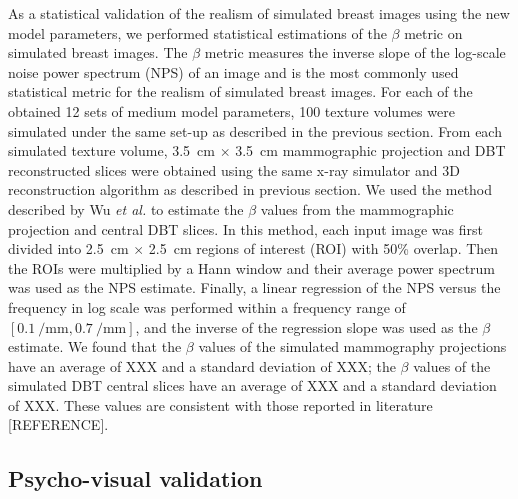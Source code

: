 \documentclass[journal]{IEEEtran}
\begin{document}
As a statistical validation of the realism of simulated breast images
using the new model parameters, we performed statistical estimations
of the $\beta$ metric on simulated breast images. The $\beta$ metric
measures the inverse slope of the log-scale noise power spectrum (NPS)
of an image and is the most commonly used statistical metric for the
realism of simulated breast images. For each of the obtained 12 sets
of medium model parameters, 100 texture volumes were simulated under
the same set-up as described in the previous section. From each
simulated texture volume, \SI{3.5}{\cm} $\times$ \SI{3.5}{\cm}
mammographic projection and DBT reconstructed slices were obtained
using the same x-ray simulator and 3D reconstruction algorithm as
described in previous section. We used the method described by Wu
\textit{et al.} \cite{wu2012spectral} to estimate the $\beta$ values
from the mammographic projection and central DBT slices. In this
method, each input image was first divided into \SI{2.5}{\cm} $\times$
\SI{2.5}{\cm} regions of interest (ROI) with 50\% overlap. Then the
ROIs were multiplied by a Hann window and their average power spectrum
was used as the NPS estimate. Finally, a linear regression of the NPS
versus the frequency in log scale was performed within a frequency
range of $\left[ \SI{0.1}{\per\mm}, \SI{0.7}{\per\mm} \right]$, and
the inverse of the regression slope was used as the $\beta$
estimate. We found that the $\beta$ values of the simulated
mammography projections have an average of XXX and a standard
deviation of XXX; the $\beta$ values of the simulated DBT central
slices have an average of XXX and a standard deviation of XXX. These
values are consistent with those reported in literature [REFERENCE].

\subsection{Psycho-visual validation}
\label{sec:psych-valid-valid}
\end{document}
